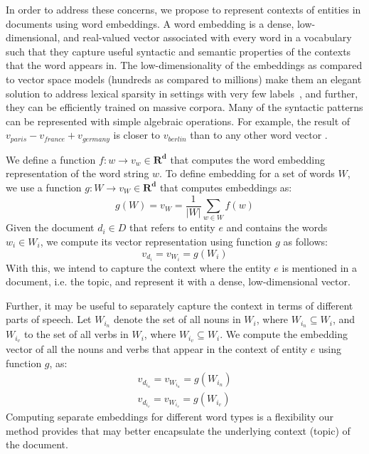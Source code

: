 \documentclass{sig-alternate}
\begin{document}
In order to address these concerns, we propose to represent contexts of entities in documents using word embeddings.
A word embedding is a dense, low-dimensional, and real-valued vector associated with every word in a vocabulary such that they capture useful syntactic and semantic properties of the contexts that the word appears in.
The low-dimensionality of the embeddings as compared to vector space models (hundreds as compared to millions) make them an elegant solution to address lexical sparsity in settings with very few labels~\cite{Turian10wordrepresentations}, and further, they can be efficiently trained on massive corpora.
Many of the syntactic patterns can be represented with simple algebraic operations. For example, the result of $v_{paris} - v_{france} + v_{germany}$ is closer to $v_{berlin}$ than to any other word vector \cite{mikolovChen,mikolovYih}.


We define a function $f : w \rightarrow v_w \in \mathbf{R^d}$ that computes the word embedding representation of the word string $w$. 
To define embedding for a set of words $W$, we use a function $g : W \rightarrow v_W \in \mathbf{R^d}$ that computes embeddings as: %
\begin{equation}
\label{wordembedding}
g(W) = v_W = \frac{1}{|W|} \sum_{w \in W}{f(w)}
\end{equation}
Given the document $d_i \in D$ that refers to entity $e$ and contains the words $w_i \in W_i$, we compute its vector representation using function $g$ as follows:
\begin{equation}
\label{wordembedding1}
v_{d_i} = v_{W_i} = g(W_i)
\end{equation}
With this, we intend to capture the context where the entity $e$ is mentioned in a document, i.e. the topic, and represent it with a dense, low-dimensional vector.

Further, it may be useful to separately capture the context in terms of different parts of speech.
Let $W_{i_n}$ denote the set of all nouns in $W_i$, where $W_{i_n} \subseteq W_i$, and $W_{i_v}$ to the set of all verbs in $W_i$, where $W_{i_v} \subseteq W_i$. We compute the embedding vector of all the nouns and verbs that appear in the context of entity $e$ using function $g$, as: %
\begin{eqnarray}
v_{d_{i_n}} = v_{W_{i_n}} = g(W_{i_n})\label{nouns}
\\
v_{d_{i_v}} = v_{W_{i_v}} = g(W_{i_v})\label{verbs}
\end{eqnarray}
Computing separate embeddings for different word types is a flexibility our method provides that may better encapsulate the underlying context (topic) of the document.
\end{document}
